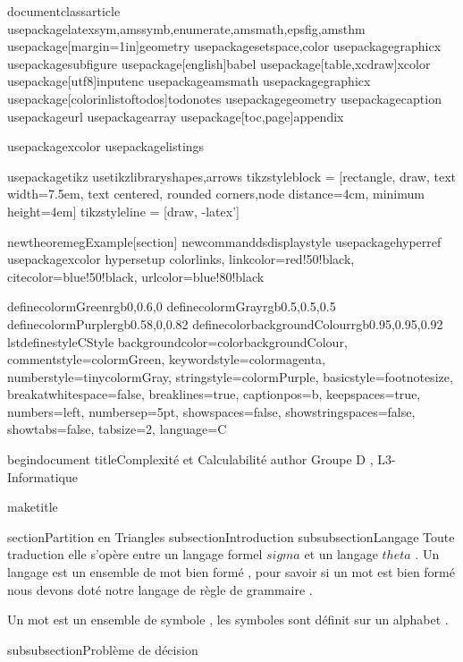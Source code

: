 documentclass{article}
usepackage{latexsym,amssymb,enumerate,amsmath,epsfig,amsthm}
usepackage[margin=1in]{geometry}
usepackage{setspace,color}
usepackage{graphicx}
usepackage{subfigure}
usepackage[english]{babel}
usepackage[table,xcdraw]{xcolor}
usepackage[utf8]{inputenc}
usepackage{amsmath}
usepackage{graphicx}
usepackage[colorinlistoftodos]{todonotes}
usepackage{geometry}
usepackage{caption}
usepackage{url}
usepackage{array}
usepackage[toc,page]{appendix}

usepackage{xcolor}
usepackage{listings}

usepackage{tikz}
usetikzlibrary{shapes,arrows}
tikzstyle{block} = [rectangle, draw, text width=7.5em, text centered, rounded corners,node distance=4cm, minimum height=4em]
tikzstyle{line} = [draw, -latex']

newtheorem{eg}{Example}[section]
newcommand{ds}{displaystyle}
usepackage{hyperref}
usepackage{xcolor}
hypersetup{
    colorlinks,
    linkcolor={red!50!black},
    citecolor={blue!50!black},
    urlcolor={blue!80!black}
}


definecolor{mGreen}{rgb}{0,0.6,0}
definecolor{mGray}{rgb}{0.5,0.5,0.5}
definecolor{mPurple}{rgb}{0.58,0,0.82}
definecolor{backgroundColour}{rgb}{0.95,0.95,0.92}
lstdefinestyle{CStyle}{
    backgroundcolor=color{backgroundColour},   
    commentstyle=color{mGreen},
    keywordstyle=color{magenta},
    numberstyle=tinycolor{mGray},
    stringstyle=color{mPurple},
    basicstyle=footnotesize,
    breakatwhitespace=false,         
    breaklines=true,                 
    captionpos=b,                    
    keepspaces=true,                 
    numbers=left,                    
    numbersep=5pt,                  
    showspaces=false,                
    showstringspaces=false,
    showtabs=false,                  
    tabsize=2,
    language=C
}

begin{document}
title{Complexité et Calculabilité}
author{
Groupe D , L3-Informatique }

maketitle



section{Partition en Triangles }
subsection{Introduction }
subsubsection{Langage }
Toute traduction elle s'opère entre un langage formel $sigma $ et un langage $theta$ .
Un langage est un ensemble de mot bien formé , pour savoir si un mot est bien formé nous devons doté notre langage de règle de grammaire .

Un mot est un ensemble de symbole , les symboles sont définit sur un alphabet .

subsubsection{Problème de décision}

